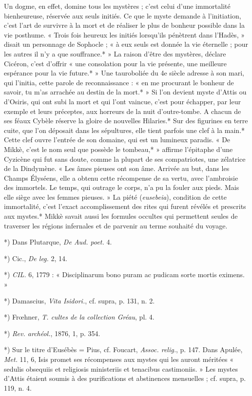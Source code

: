 \documentclass[a4paper, 11pt, oneside, polutonikogreek, french]{article}
\begin{document}
Un dogme, en effet, domine tous les mystères ; c'est celui d'une immortalité bienheureuse, réservée aux seuls initiés. Ce que le myste demande à l'initiation, c'est l'art de survivre à la mort et de réaliser le plus de bonheur possible dans la vie posthume. « Trois fois heureux les initiés lorsqu'ils pénètrent dans l'Hadès, » disait un personnage de Sophocle ; « à eux seuls est donnée la vie éternelle ; pour les autres il n'y a que souffrance.* » La raison d'être des mystères, déclare Cicéron, c'est d'offrir « une consolation pour la vie présente, une meilleure espérance pour la vie future.* » Une tauroboliée du 4e siècle adresse à son mari, qui l'initia, cette parole de reconnaissance : « en me procurant le bonheur de savoir, tu m'as arrachée au destin de la mort.* » Si l'on devient myste d'Attis ou d'Osiris, qui ont subi la mort et qui l'ont vaincue, c'est pour échapper, par leur exemple et leurs préceptes, aux horreurs de la nuit d'outre-tombe. A chacun de ses féaux Cybèle réserve la gloire de nouvelles Hilaries.* Sur des figurines en terre cuite, que l'on déposait dans les sépultures, elle tient parfois une clef à la main.* Cette clef ouvre l'entrée de son domaine, qui est un lumineux paradis. « De Mikkè, c'est le nom seul que possède le tombeau,* » affirme l'épitaphe d'une Cyzicène qui fut sans doute, comme la plupart de ses compatriotes, une zélatrice de la Dindymène. « Les âmes pieuses ont son âme. Arrivée au but, dans les Champs Élyséens, elle a obtenu cette récompense de sa vertu, avec l'ambroisie des immortels. Le temps, qui outrage le corps, n'a pu la fouler aux pieds. Mais elle siège avec les femmes pieuses. » La piété (\emph{eusebeia}), condition de cette immortalité, c'est l'exact accomplissement des rites qui furent révélés et prescrits aux mystes.* Mikkè savait aussi les formules occultes qui permettent seules de traverser les régions infernales et de parvenir au terme souhaité du voyage.

*) Dans Plutarque, \emph{De Aud. poet.} 4.

*) Cic., \emph{De leg.} 2, 14.

*) \emph{CIL.} 6, 1779 : « Disciplinarum bono puram ac pudicam sorte mortis eximens. »

*) Damascius, \emph{Vita Isidori.}, cf. supra, p. 131, n. 2.

*) Frœhner, \emph{T. cultes de la collection Gréau}, pl. 4.

*) \emph{Rev. archéol.}, 1876, 1, p. 354.

*) Sur le titre d'Eusébès = Pius, cf. Foucart, \emph{Assoc. relig.}, p. 147. Dans Apulée, \emph{Met.} 11, 6, Isis promet ses récompenses aux mystes qui les auront méritées « sedulis obsequiis et religiosis ministeriis et tenacibus castimoniis. » Les mystes d'Attis étaient soumis à des purifications et abstinences mensuelles ; cf. supra, p. 119, n. 4.
\end{document}
